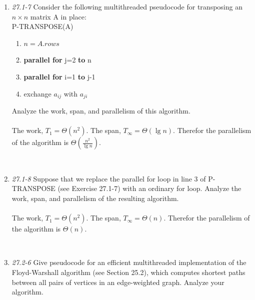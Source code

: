\documentclass[]{memoir}
\begin{document}
\begin{enumerate}
\item \textit{27.1-7} Consider the following multithreaded pseudocode for transposing an $n\times n$ matrix A in place:\\
P-TRANSPOSE(A)
\begin{enumerate}[label=\arabic*\hspace{2mm}]
	\item $n = A.rows$	
	\item \textbf{parallel for} j=2 \textbf{to} n
	\item \hspace{1cm} \textbf{parallel for} i=1 \textbf{to} j-1
	\item \hspace{2cm} exchange $a_{ij}$ with $a_{ji}$
\end{enumerate}
Analyze the work, span, and parallelism of this algorithm.
\paragraph{}
\begin{Large}
The work, $T_{1}=\Theta{}(n^{2})$. The span, $T_{\infty} = \Theta{}(\lg{n})$. Therefor the parallelism of the algorithm is $\Theta{}(\frac{n^{2}}{\lg{n}})$.
\end{Large}
\\\item \textit{27.1-8} Suppose that we replace the parallel for loop in line 3 of P-TRANSPOSE (see Exercise 27.1-7) with an ordinary for loop.  Analyze the work, span, and parallelism of the resulting algorithm.
\paragraph{}
\begin{Large}
The work, $T_{1}=\Theta{}(n^{2})$. The span, $T_{\infty} = \Theta{}(n)$. Therefor the parallelism of the algorithm is $\Theta{}(n)$.
\end{Large}
\\\item \textit{27.2-6} Give 
pseudocode for an efficient multithreaded implementation of the Floyd-Warshall algorithm (see Section 25.2), which computes shortest paths between all pairs of vertices in an edge-weighted graph. Analyze your algorithm.


\end{enumerate}
\end{document}
